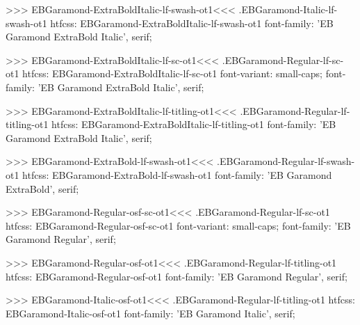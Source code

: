 {{{{{{{>>>
\<EBGaramond-ExtraBoldItalic-lf-swash-ot1\><<<
.EBGaramond-Italic-lf-swash-ot1
htfcss:  EBGaramond-ExtraBoldItalic-lf-swash-ot1  font-family: 'EB Garamond ExtraBold Italic', serif;

>>>
\<EBGaramond-ExtraBoldItalic-lf-sc-ot1\><<<
.EBGaramond-Regular-lf-sc-ot1
htfcss:  EBGaramond-ExtraBoldItalic-lf-sc-ot1  font-variant: small-caps; font-family: 'EB Garamond ExtraBold Italic', serif;

>>>
\<EBGaramond-ExtraBoldItalic-lf-titling-ot1\><<<
.EBGaramond-Regular-lf-titling-ot1
htfcss:  EBGaramond-ExtraBoldItalic-lf-titling-ot1  font-family: 'EB Garamond ExtraBold Italic', serif;

>>>
\<EBGaramond-ExtraBold-lf-swash-ot1\><<<
.EBGaramond-Regular-lf-swash-ot1
htfcss:  EBGaramond-ExtraBold-lf-swash-ot1  font-family: 'EB Garamond ExtraBold', serif;

>>>
\<EBGaramond-Regular-osf-sc-ot1\><<<
.EBGaramond-Regular-lf-sc-ot1
htfcss:  EBGaramond-Regular-osf-sc-ot1  font-variant: small-caps; font-family: 'EB Garamond Regular', serif;

>>>
\<EBGaramond-Regular-osf-ot1\><<<
.EBGaramond-Regular-lf-titling-ot1
htfcss:  EBGaramond-Regular-osf-ot1  font-family: 'EB Garamond Regular', serif;

>>>
\<EBGaramond-Italic-osf-ot1\><<<
.EBGaramond-Regular-lf-titling-ot1
htfcss:  EBGaramond-Italic-osf-ot1  font-family: 'EB Garamond Italic', serif;

}}}}}}}
